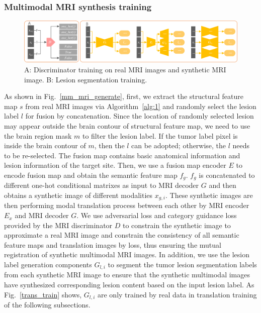 \documentclass{ecai}
\begin{document}
\subsubsection{Multimodal MRI synthesis training}
\begin{figure}
	\centering
	\includegraphics[width=1.98\columnwidth]{figures/DandSEG}
	\caption{A: Discriminator training on real MRI images and synthetic MRI image. B: Lesion segmentation training.}
	\label{train_D}
	\label{segmentation}
\end{figure}
As shown in Fig.~\ref{mm_mri_generate}, first, we extract the structural feature map $s$ from real MRI images via Algorithm~\ref{alg:1} and randomly select the lesion label $l$ for fusion by concatenation. Since the location of randomly selected lesion may appear outside the brain contour of structural feature map, we need to use the brain region mask $m$ to filter the lesion label. If the tumor label pixel is inside the brain contour of $m$, then the $l$ can be adopted; otherwise, the $l$ needs to be re-selected. The fusion map contains basic anatomical information and lesion information of the target site. Then, we use a fusion map encoder $E$ to encode fusion map and obtain the semantic feature map $f_g$. $f_g$ is concatenated to different one-hot conditional matrixes as input to MRI decoder $G$ and then obtains a synthetic image of different modalities $x_{g,i}$. These synthetic images are then performing modal translation process between each other by MRI encoder $E_x$ and MRI decoder $G$. We use adversarial loss and category guidance loss provided by the MRI discriminator $D$ to constrain the synthetic image to approximate a real MRI image and constrain the consistency of all semantic feature maps and translation images by loss, thus ensuring the mutual registration of synthetic multimodal MRI images. 
In addition, we use the lesion label generation components $G_{l,i}$ to segment the tumor lesion segmentation labels from each synthetic MRI image to ensure that the synthetic multimodal images have synthesized corresponding lesion content based on the input lesion label. As Fig.~\ref{trans_train} shows, $G_{l,i}$ are only trained by real data in translation training of the following subsections. 
\end{document}
